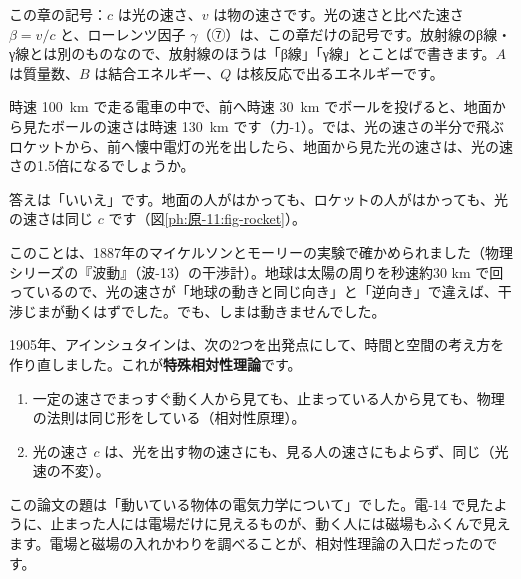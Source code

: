 \noindent この章の記号：$c$ は光の速さ、$v$ は物の速さです。光の速さと比べた速さ $\beta=v/c$ と、ローレンツ因子 $\gamma$（⑦）は、この章だけの記号です。放射線のβ線・γ線とは別のものなので、放射線のほうは「β線」「γ線」とことばで書きます。$A$ は質量数、$B$ は結合エネルギー、$Q$ は核反応で出るエネルギーです。



\label{ph:原-11:sec1}
時速 \qty{100}{km} で走る電車の中で、前へ時速 \qty{30}{km} でボールを投げると、地面から見たボールの速さは時速 \qty{130}{km} です（力-1）。では、光の速さの半分で飛ぶロケットから、前へ懐中電灯の光を出したら、地面から見た光の速さは、光の速さの1.5倍になるでしょうか。

答えは「いいえ」です。地面の人がはかっても、ロケットの人がはかっても、光の速さは同じ $c$ です（図\ref{ph:原-11:fig-rocket}）。
\begin{bkfigure}
\label{ph:原-11:fig-rocket}
\end{bkfigure}
このことは、1887年のマイケルソンとモーリーの実験で確かめられました（物理シリーズの『波動』（波-13）の干渉計）。地球は太陽の周りを秒速約30 km で回っているので、光の速さが「地球の動きと同じ向き」と「逆向き」で違えば、干渉じまが動くはずでした。でも、しまは動きませんでした。

1905年、アインシュタインは、次の2つを出発点にして、時間と空間の考え方を作り直しました。これが\textbf{特殊相対性理論}です。
\begin{enumerate}[label={\bkcircled{\arabic*}}, leftmargin=2.4\zw, itemsep=1pt, topsep=2pt]
\item 一定の速さでまっすぐ動く人から見ても、止まっている人から見ても、物理の法則は同じ形をしている（相対性原理）。
\item 光の速さ $c$ は、光を出す物の速さにも、見る人の速さにもよらず、同じ（光速の不変）。
\end{enumerate}
この論文の題は「動いている物体の電気力学について」でした。電-14 で見たように、止まった人には電場だけに見えるものが、動く人には磁場もふくんで見えます。電場と磁場の入れかわりを調べることが、相対性理論の入口だったのです。

